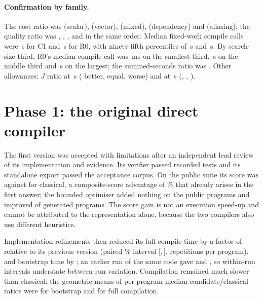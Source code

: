 \documentclass[11pt,a4paper]{article}
\newcommand{\ci}[2]{[#1,\,#2]}
\begin{document}
\paragraph{Confirmation by family.} The cost ratio was  (scalar),
 (vector),  (mixed),  (dependency) and
 (aliasing); the quality ratio was , ,
,  and  in the same order. Median
fixed-work compile calls were \,s for C1 and \,s for R0,
with ninety-fifth percentiles of \,s and \,s. By search-size
third, R0's median compile call was \,ms on the smallest third,
\,s on the middle third and \,s on the largest; the summed-seconds
ratio was . Other allowances: $J$ ratio  at \,s (
better,  equal,  worse) and  at \,s (, ,
).

\section{Phase 1: the original direct compiler}\label{sec:phase1}

The first version was accepted with limitations after an independent lead review
of its implementation and evidence. Its verifier passed  recorded tests
and its standalone export passed the acceptance corpus. On the public suite its
score was  against  for classical, a composite-score
advantage of \% that already arises in the first answer; the bounded
optimiser added nothing on the public programs and improved  of
 generated programs. The score gain is not an execution speed-up and
cannot be attributed to the representation alone, because the two compilers also
use different heuristics.

Implementation refinements then reduced its full compile time by a factor of
 relative to its previous version (paired \% interval
\ci{}{},  repetitions per program), and
bootstrap time by ; an earlier run of the same code gave
 and , so within-run intervals understate
between-run variation. Compilation remained much slower than classical: the
geometric means of per-program median candidate/classical ratios were
 for bootstrap and  for full compilation.
\end{document}
